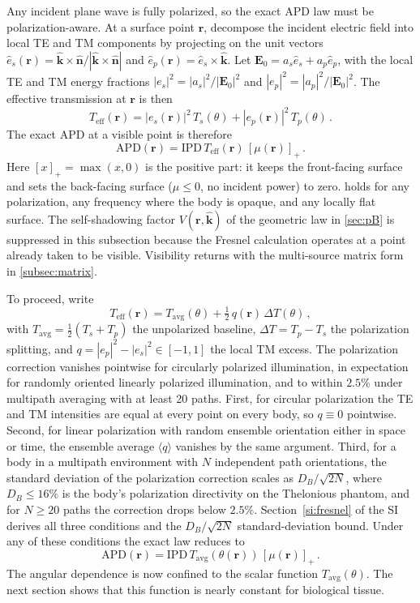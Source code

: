 \documentclass[journal,twocolumn,10pt]{IEEEtran}
\newcommand{\khat}{\hat{\bm{k}}}
\newcommand{\nhat}{\hat{\bm{n}}}
\newcommand{\rr}{\mathbf{r}}
\newcommand{\EE}{\mathbf{E}}
\newcommand{\IPD}{\mathrm{IPD}}
\newcommand{\APD}{\mathrm{APD}}
\newcommand{\Teff}{T_{\mathrm{eff}}}
\newcommand{\Tavg}{T_{\mathrm{avg}}}
\newcommand{\pospart}[1]{\left[#1\right]_{+}}
\newcommand{\Vis}{V}
\begin{document}
Any incident plane wave is fully polarized, so the exact \gls{APD}
law must be polarization-aware. At a surface point
$\rr$, decompose the incident electric field into local TE and TM
components by projecting on the unit vectors
$\hat{e}_s(\rr) = \khat \times \nhat / |\khat \times \nhat|$ and
$\hat{e}_p(\rr) = \hat{e}_s \times \khat$. Let $\EE_0 = a_s \hat{e}_s + a_p \hat{e}_p$, with the local TE and TM
energy fractions $|e_s|^2 = |a_s|^2 / |\EE_0|^2$ and
$|e_p|^2 = |a_p|^2 / |\EE_0|^2$. The effective transmission at $\rr$
is then
\begin{equation}\label{eq:Teff}
  \Teff(\rr) = |e_s(\rr)|^2 \, T_s(\theta) + |e_p(\rr)|^2 \,
  T_p(\theta)\, .
\end{equation}
The exact \gls{APD} at a visible point is therefore
\begin{equation}\label{eq:Sab-exact}
  \APD(\rr) = \IPD \, \Teff(\rr) \, \pospart{\mu(\rr)} \,.
\end{equation}
Here $\pospart{x} = \max(x, 0)$ is the positive part: it keeps the
front-facing surface and sets the back-facing surface ($\mu \le 0$, no
incident power) to zero.
 holds for any polarization, any frequency where
the body is opaque, and any locally flat surface. The self-shadowing
factor $\Vis(\rr,\khat)$ of the geometric law in \cref{sec:pB} is
suppressed in this subsection because the Fresnel calculation
operates at a point already taken to be visible. Visibility returns
with the multi-source matrix form in \cref{subsec:matrix}.

To proceed, write
\begin{equation}\label{eq:Teff-decomp}
  \Teff(\rr) = \Tavg(\theta) + \tfrac{1}{2}\,q(\rr)\,\Delta T(\theta)\, ,
\end{equation}
with $\Tavg = \tfrac{1}{2}(T_s + T_p)$ the unpolarized baseline,
$\Delta T = T_p - T_s$ the polarization splitting, and $q = |e_p|^2 -
|e_s|^2 \in [-1, 1]$ the local TM excess. The polarization correction
vanishes pointwise for circularly polarized illumination, in expectation
for randomly oriented linearly polarized illumination, and to within
$2.5\%$ under multipath averaging with at least 20 paths. First, for circular polarization
the TE and TM intensities are equal at every point on every body, so
$q \equiv 0$ pointwise. Second, for linear polarization with random
ensemble orientation either in space or time, the ensemble average
$\langle q\rangle$ vanishes by the same argument. Third, for a body
in a multipath environment with $N$ independent path orientations,
the standard deviation of the polarization correction scales as $D_B/\sqrt{2N}$,
where $D_B \le 16\%$ is the body's polarization directivity on the
Thelonious phantom, and for $N \ge 20$ paths the correction drops
below $2.5\%$. Section~\ref{si:fresnel} of the SI derives all three
conditions and the $D_B/\sqrt{2N}$ standard-deviation bound. Under any of these conditions the exact law reduces to
\begin{equation}\label{eq:Sab-Tavg}
  \APD(\rr) = \IPD \, \Tavg(\theta(\rr)) \, \pospart{\mu(\rr)}\, .
\end{equation}
The angular dependence is now confined to the scalar function
$\Tavg(\theta)$. The next section shows that this function is nearly
constant for biological tissue.
\end{document}
